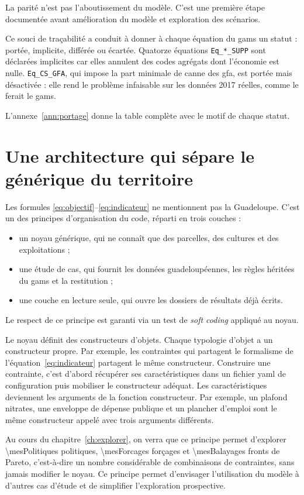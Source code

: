 La parité n'est pas l'aboutissement du modèle. C'est une première étape documentée avant
amélioration du modèle et exploration des scénarios.

Ce souci de traçabilité a conduit à donner à chaque équation du \gls{gams} un statut : portée,
implicite, différée ou écartée. Quatorze équations \texttt{Eq\_*\_SUPP} sont déclarées implicites
car elles annulent des codes agrégats dont l'économie est nulle. \texttt{Eq\_CS\_GFA}, qui impose
la part minimale de canne des \gls{gfa}, est portée mais désactivée : elle rend le problème
infaisable sur les données 2017 réelles, comme le ferait le \gls{gams}.

L'annexe~\ref{ann:portage} donne la table complète avec le motif de chaque statut.

\section{Une architecture qui sépare le générique du territoire}
\label{sec:architecture}

Les formules \eqref{eq:objectif}--\eqref{eq:indicateur} ne mentionnent pas la Guadeloupe. C'est
un des principes d'organisation du code, réparti en trois couches :
\begin{itemize}
  \item un noyau générique, qui ne connaît que des parcelles, des cultures et des exploitations ;
  \item une étude de cas, qui fournit les données guadeloupéennes, les règles héritées du
    \gls{gams} et la restitution ;
  \item une couche en lecture seule, qui ouvre les dossiers de résultats déjà écrits.
\end{itemize}
Le respect de ce principe est garanti via un test de \emph{soft coding} appliqué au noyau.

Le noyau définit des constructeurs d'objets. Chaque typologie d'objet a un constructeur propre.
Par exemple, les contraintes qui partagent le formalisme de l'équation~\eqref{eq:indicateur}
partagent le même constructeur. Construire une contrainte, c'est d'abord récupérer ses
caractéristiques dans un fichier \gls{yaml} de configuration puis mobiliser le constructeur
adéquat. Les caractéristiques deviennent les arguments de la fonction constructeur. Par exemple,
un plafond nitrates, une enveloppe de dépense publique et un plancher d'emploi sont le même
constructeur appelé avec trois arguments différents.

Au cours du chapitre~\ref{ch:explorer}, on verra que ce principe permet d'explorer
\num{\mesPolitiques} politiques, \num{\mesForcages} forçages et \num{\mesBalayages} fronts de
Pareto, c'est-à-dire un nombre considérable de combinaisons de contraintes, sans jamais modifier
le noyau. Ce principe permet d'envisager l'utilisation du modèle à d'autres cas d'étude et de
simplifier l'exploration prospective.

